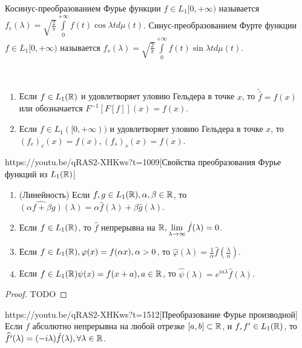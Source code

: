\begin{Def}
	Косинус-преобразованием Фурье функции $f\in L_1[0,+\infty)$ называется $f_c(\lambda)=\sqrt{\frac{2}{\pi}}\int\limits_0^{+\infty}f(t)\cos\lambda td\mu(t)$. Синус-преобразованием Фурте функции $f\in L_1[0,+\infty)$ называется $f_s(\lambda)=\sqrt{\frac{2}{\pi}}\int\limits_0^{+\infty}f(t)\sin\lambda td\mu(t)$.
\end{Def}

\begin{corollary}\ \\
	\begin{enumerate}
		\item Если $f\in L_1(\mathbb{R})$ и удовлетворяет уловию Гельдера в точке $x$, то $\tilde{\hat{f}}=f(x)$ или обозначается $F^{-1}[F[f]](x)=f(x)$.
		\item Если $f\in L_1([0,+\infty))$ и удовлетворяет уловию Гельдера в точке $x$, то $(f_c)_c(x)=f(x), (f_s)_s(x)=f(x)$.
	\end{enumerate}
\end{corollary}

\begin{linkthm}{https://youtu.be/qRAS2-XHKws?t=1009}[Свойства преобразования Фурье функций из $L_1(\mathbb{R})$]\ \\
	\begin{enumerate}
		\item (Линейность) Если $f,g\in L_1(\mathbb{R}), \alpha, \beta\in\mathbb{R}$, то $\widehat{\left(\alpha f+\beta g\right)}(\lambda)=\alpha\hat{f}(\lambda)+\beta\hat{g}(\lambda)$.
		\item Если $f\in L_1(\mathbb{R})$, то $\hat{f}$ непрерывна на $\mathbb{R}, \lim\limits_{\lambda\to\infty}\hat{f}(\lambda)=0$.
		\item Если $f\in L_1(\mathbb{R}), \varphi(x)=f(\alpha x), \alpha>0$, то $\hat{\varphi}(\lambda)=\frac{1}{\alpha}\hat{f}\left(\frac{\lambda}{\alpha}\right)$.
		\item Если $f\in L_1(\mathbb{R}) \psi(x)=f(x+a), a\in\mathbb{R}$, то $\hat{\psi}(\lambda)=e^{ia\lambda}\hat{f}(\lambda)$. 
	\end{enumerate}
\end{linkthm}
\begin{proof}
	TODO
\end{proof}

\begin{linkthm}{https://youtu.be/qRAS2-XHKws?t=1512}[Преобразование Фурье производной]\ \\
	Если $f$ абсолютно непрерывна на любой отрезке $[a,b]\subset\mathbb{R}$, и $f,f'\in L_1(\mathbb{R})$, то $\widehat{f'}(\lambda)=(-i\lambda)\hat{f}(\lambda), \forall\lambda\in\mathbb{R}$.
\end{linkthm}

